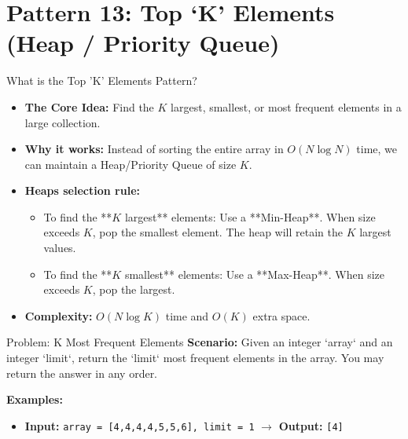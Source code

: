 \section{Pattern 13: Top ‘K’ Elements (Heap / Priority Queue)}

\begin{frame}[c]{\empty}
    \begin{center}
        \Large\textbf{\secname}
    \end{center}
\end{frame}

\begin{frame}{What is the Top 'K' Elements Pattern?}
  \begin{itemize}
    \item \textbf{The Core Idea:} Find the $K$ largest, smallest, or most frequent elements in a large collection.
    \item \textbf{Why it works:} Instead of sorting the entire array in $O(N \log N)$ time, we can maintain a Heap/Priority Queue of size $K$.
    \item \textbf{Heaps selection rule:}
      \begin{itemize}
        \item To find the **$K$ largest** elements: Use a **Min-Heap**. When size exceeds $K$, pop the smallest element. The heap will retain the $K$ largest values.
        \item To find the **$K$ smallest** elements: Use a **Max-Heap**. When size exceeds $K$, pop the largest.
      \end{itemize}
    \item \textbf{Complexity:} $O(N \log K)$ time and $O(K)$ extra space.
  \end{itemize}
\end{frame}

\begin{frame}[fragile]{Problem: K Most Frequent Elements}
  \textbf{Scenario:}
  Given an integer `array` and an integer `limit`, return the `limit` most frequent elements in the array. You may return the answer in any order.
  
  \vspace{0.3cm}
  \textbf{Examples:}
  \begin{itemize}
    \item \textbf{Input:} \texttt{array = [4,4,4,4,5,5,6], limit = 1} $\rightarrow$ \textbf{Output:} \texttt{[4]}
  \end{itemize}
\end{frame}

